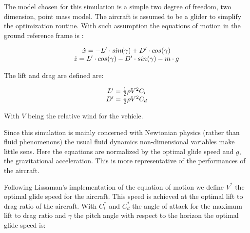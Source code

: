 

\par The model chosen for this simulation is a simple two degree of freedom, two dimension, point mass model. 
The aircraft is assumed to be a glider to simplify the optimization routine. 
With such assumption the equations of motion in the ground reference frame is :

\begin{equation}
	\begin{array}[c]{c}
		\dot{x}= -L' \cdot sin(\gamma) + D' \cdot cos(\gamma) \\ 
		\dot{z}= L' \cdot cos(\gamma) - D' \cdot sin(\gamma) - m \cdot g
	\end{array}
	\label{eqn:eqm}
\end{equation}


\par The lift and drag are defined are: 

\begin{equation}
	\begin{array}[c]{c}
		L'= \frac{1}{2} \rho V^2 C_l \\ 
		D'= \frac{1}{2} \rho V^2 C_d 
	\end{array}
	\label{eqn:Cl_def}
\end{equation}

\par With $V$ being the relative wind for the vehicle.

\par Since this simulation is mainly concerned with Newtonian physics (rather than fluid phenomenons) the usual fluid dynamics non-dimensional variables make little sens.
Here the equations are normalized by the optimal glide speed and $g$, the gravitational acceleration.
This is more representative of the performances of the aircraft.

\par Following Lissaman's \cite{lissaman2005wind} implementation of the equation of motion we define $V^*$ the optimal glide speed for the aircraft. This speed is achieved at the optimal lift to drag ratio of the aircraft.
With $C_l^*$ and $C_d^*$ the angle of attack for the maximum lift to drag ratio and $\gamma$ the pitch angle with respect to the horizon the optimal glide speed is:

